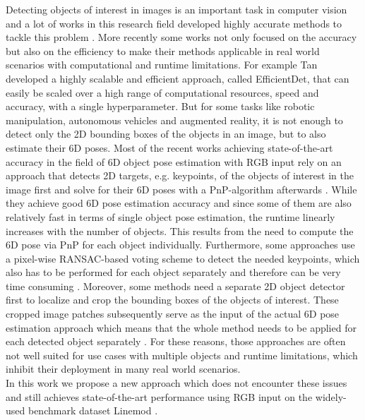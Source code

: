 \documentclass[twocolumn, 10pt, letterpaper]{article}
\begin{document}
Detecting objects of interest in images is an important task in computer vision and a lot of works in this research field developed highly accurate methods to tackle this problem \cite{DetectorRS}\cite{SpineNet}\cite{AmoebaNet_NAS_FPN}\cite{RetinaNet}\cite{faster_rcnn}. More recently some works not only focused on the accuracy but also on the efficiency to make their methods applicable in real world scenarios with computational and runtime limitations\cite{CSPNet}\cite{EfficientDet}. For example Tan \etal\cite{EfficientDet} developed a highly scalable and efficient approach, called EfficientDet, that can easily be scaled over a high range of computational resources, speed and accuracy, with a single hyperparameter. But for some tasks like robotic manipulation, autonomous vehicles and augmented reality, it is not enough to detect only the 2D bounding boxes of the objects in an image, but to also estimate their 6D poses. Most of the recent works achieving state-of-the-art accuracy in the field of 6D object pose estimation with RGB input rely on an approach that detects 2D targets, e.g. keypoints, of the objects of interest in the image first and solve for their 6D poses with a PnP-algorithm afterwards \cite{YOLO6D}\cite{Pix2Pose}\cite{PVNet}\cite{DPOD}\cite{CDPN}\cite{HybridPose}. While they achieve good 6D pose estimation accuracy and since some of them are also relatively fast in terms of single object pose estimation, the runtime linearly increases with the number of objects. This results from the need to compute the 6D pose via PnP for each object individually. Furthermore, some approaches use a pixel-wise RANSAC-based\cite{RANSAC} voting scheme to detect the needed keypoints, which also has to be performed for each object separately and therefore can be very time consuming \cite{PVNet}\cite{HybridPose}. Moreover, some methods need a separate 2D object detector first to localize and crop the bounding boxes of the objects of interest. These cropped image patches subsequently serve as the input of the actual 6D pose estimation approach which means that the whole method needs to be applied for each detected object separately \cite{Pix2Pose}\cite{CDPN}. For these reasons, those approaches are often not well suited for use cases with multiple objects and runtime limitations, which inhibit their deployment in many real world scenarios.\\
In this work we propose a new approach which does not encounter these issues and still achieves state-of-the-art performance using RGB input on the widely-used benchmark dataset Linemod \cite{Linemod}.
\end{document}
